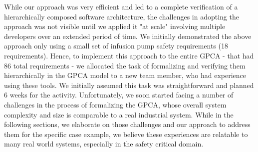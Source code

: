 While our approach was very efficient and led to a complete verification of a hierarchically composed software architecture, the challenges in adopting the approach was not visible until we applied it "at scale" involving multiple developers over an extended period of time. We initially demonstrated the above approach only using a small set of infusion pump safety requirements (18 requirements). Hence, to implement this approach to the entire GPCA - that had 86 total requirements - we allocated the task of formalizing and verifying them hierarchically in the GPCA model to a new team member, who had experience using these tools. We initially assumed this task was straightforward and planned 6 weeks for the activity. Unfortunately, we soon started facing a number of challenges in the process of formalizing the GPCA, whose overall system complexity and size is comparable to a real industrial system. While in the following sections, we elaborate on those challenges and our approach to address them for the specific case example, we believe these experiences are relatable to many real world systems, especially in the safety critical domain. %

%


